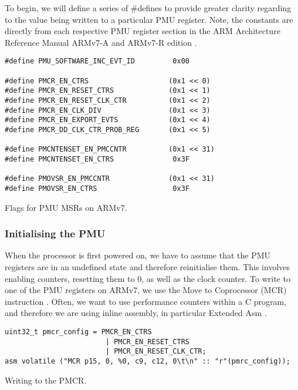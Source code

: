 {To begin, we will define a series of \#defines to provide greater clarity regarding to the value being written to a particular PMU register. Note, the constants are directly from each respective PMU register section in the ARM Architecture Reference Manual ARMv7-A and ARMv7-R edition \cite{DocsArvm7}.

\begin{listing}
    \begin{verbatim}
#define PMU_SOFTWARE_INC_EVT_ID         0x00

#define PMCR_EN_CTRS                   (0x1 << 0)
#define PMCR_EN_RESET_CTRS             (0x1 << 1)
#define PMCR_EN_RESET_CLK_CTR          (0x1 << 2)
#define PMCR_EN_CLK_DIV                (0x1 << 3)
#define PMCR_EN_EXPORT_EVTS            (0x1 << 4)
#define PMCR_DD_CLK_CTR_PROB_REG       (0x1 << 5)

#define PMCNTENSET_EN_PMCCNTR          (0x1 << 31)
#define PMCNTENSET_EN_CTRS              0x3F

#define PMOVSR_EN_PMCCNTR              (0x1 << 31)
#define PMOVSR_EN_CTRS                  0x3F
    \end{verbatim}
    \caption{Flags for PMU MSRs on ARMv7.}
\end{listing}

\subsubsection{Initialising the PMU}

When the processor is first powered on, we have to assume that the PMU registers are in an undefined state and therefore reinitialise them. This involves enabling counters, resetting them to 0, as well as the clock counter. To write to one of the PMU registers on ARMv7, we use the Move to Coprocessor (MCR) instruction \cite{DocsArmMCR}. Often, we want to use performance counters within a C program, and therefore we are using inline assembly, in particular Extended Asm \cite{DocsGCCExtendedAsm}.

\begin{listing}
    \begin{verbatim}
uint32_t pmcr_config = PMCR_EN_CTRS
                        | PMCR_EN_RESET_CTRS
                        | PMCR_EN_RESET_CLK_CTR;
asm volatile ("MCR p15, 0, %0, c9, c12, 0\t\n" :: "r"(pmrc_config));
    \end{verbatim}
    \caption{Writing to the PMCR.}
\end{listing}

}
